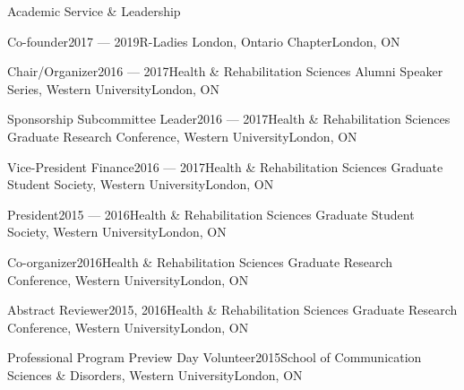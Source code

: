 \documentclass{resume} %
\begin{document}
\begin{rSection}{Academic Service \& Leadership}

	\begin{rSubsection}{Co-founder}{2017 --- 2019}{R-Ladies London, Ontario Chapter}{London, ON}
	\end{rSubsection}
	
	\begin{rSubsection}{Chair/Organizer}{2016 --- 2017}{Health \& Rehabilitation Sciences Alumni Speaker Series, Western University}{London, ON}
	\end{rSubsection}
	
	\begin{rSubsection}{Sponsorship Subcommittee Leader}{2016 --- 2017}{Health \& Rehabilitation Sciences Graduate Research Conference, Western University}{London, ON}
	\end{rSubsection}
	
	\begin{rSubsection}{Vice-President Finance}{2016 --- 2017}{Health \& Rehabilitation Sciences Graduate Student Society, Western University}{London, ON}
	\end{rSubsection}
	
	\begin{rSubsection}{President}{2015 --- 2016}{Health \& Rehabilitation Sciences Graduate Student Society, Western University}{London, ON}
	\end{rSubsection}
	
	\begin{rSubsection}{Co-organizer}{2016}{Health \& Rehabilitation Sciences Graduate Research Conference, Western University}{London, ON}
	\end{rSubsection}
	
	\begin{rSubsection}{Abstract Reviewer}{2015, 2016}{Health \& Rehabilitation Sciences Graduate Research Conference, Western University}{London, ON}
	\end{rSubsection}
	
	\begin{rSubsection}{Professional Program Preview Day Volunteer}{2015}{School of Communication Sciences \& Disorders, Western University}{London, ON}
	\end{rSubsection}


\end{rSection}

\end{document}
